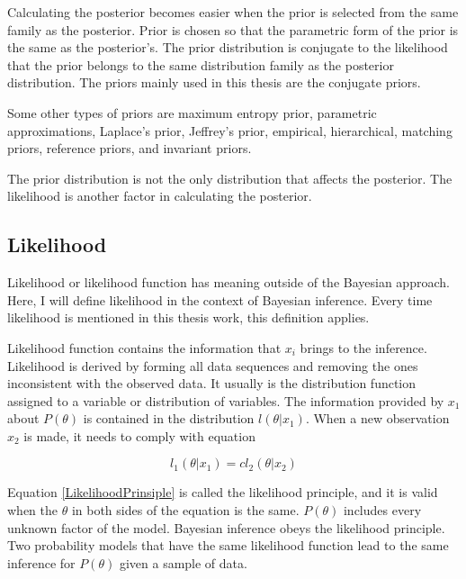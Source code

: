 Calculating the posterior becomes easier when the prior is selected from the same family as the posterior. Prior is chosen so that the parametric form of the prior is the same as the posterior's. The prior distribution is conjugate to the likelihood that the prior belongs to the same distribution family as the posterior distribution. \cite{SUGIYAMA2016185} The priors mainly used in this thesis are the conjugate priors.

Some other types of priors are maximum entropy prior, parametric approximations, Laplace's prior, Jeffrey's prior, empirical, hierarchical, matching priors, reference priors, and invariant priors. \cite{Robert2007TheBC}

The prior distribution is not the only distribution that affects the posterior. The likelihood is another factor in calculating the posterior.

\subsection{Likelihood}\label{Likelihood}
Likelihood or likelihood function has meaning outside of the Bayesian approach. Here, I will define likelihood in the context of Bayesian inference. Every time likelihood is mentioned in this thesis work, this definition applies. 

Likelihood function contains the information that $x_i$ brings to the inference.\cite{Robert2007TheBC} Likelihood is derived by forming all data sequences and removing the ones inconsistent with the observed data. It usually is the distribution function assigned to a variable or distribution of variables. \cite{Mcelreath2015StatisticalRA} The information provided by $x_1$ about $P(\theta)$ is contained in the distribution $l(\theta|x_1)$. When a new observation $x_2$ is made, it needs to comply with equation

\begin{equation}\label{LikelihoodPrinsiple}
l_1(\theta|x_1) = cl_2(\theta|x_2)
\end{equation}\cite{Robert2007TheBC}

Equation \ref{LikelihoodPrinsiple} is called the likelihood principle, and it is valid when the $\theta$ in both sides of the equation is the same. $P(\theta)$ includes every unknown factor of the model. \cite{Robert2007TheBC} Bayesian inference obeys the likelihood principle. Two probability models that have the same likelihood function lead to the same inference for $P(\theta)$ given a sample of data.\cite{Gel2014BayesianDA}

